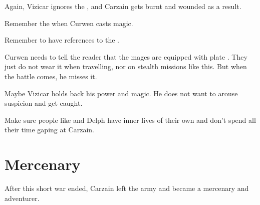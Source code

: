 \begin{changes}
  \begin{comment}
  \paragraph{The \Caliph Inviolate}
  \end{comment}
    Again, Vizicar ignores the , and Carzain gets burnt and wounded as a result. 
    
    Remember the  when Curwen casts magic. 
    
    Remember to have references to the . 
    
    Curwen needs to tell the reader that the \ishrah{} mages are equipped with plate \armour. 
    They just do not wear it when travelling, nor on stealth missions like this. 
    But when the battle comes, he misses it. 
    
    Maybe Vizicar holds back his power and magic. 
    He does not want to arouse suspicion and get caught. 
  
  \begin{comment}\paragraph{\Tsekkect{} and Delph}\end{comment}
    Make sure people like \Tsekkect{} and Delph have inner lives of their own and don't spend all their time gaping at Carzain. 
\end{changes}
















\section{Mercenary}
After this short war ended, Carzain left the army and became a mercenary and adventurer.
























